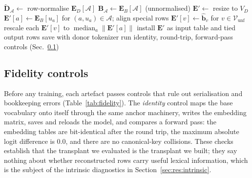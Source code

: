 \begin{algorithm}[!t]
\caption{Tokenizer transplantation ()}
\label{alg:transplant}
$\tilde{\mathbf{D}}_{\mathcal{A}}\leftarrow$ row-normalise $\mathbf{E}_D[\mathcal{A}]$\; $\mathbf{B}_{\mathcal{A}}\leftarrow\mathbf{E}_B[\mathcal{A}]$ (unnormalised)\;
$\mathbf{E}'\leftarrow$ resize to $V_D$\; $\mathbf{E}'[a]\leftarrow\mathbf{E}_B[u_a]$ for $(a,u_a)\in\mathcal{A}$; align special rows\; $\mathbf{E}'[v]\leftarrow\hat{\mathbf{b}}_v$ for $v\in\mathcal{V}_{\mathrm{unf}}$\;
rescale each $\mathbf{E}'[v]$ to $\operatorname{median}_a\|\mathbf{E}'[a]\|$ \tcp*[r]{\eqref{eq:rescale}}
install $\mathbf{E}'$ as input table and tied output rows\; save with donor tokenizer\;
run identity, round-trip, forward-pass controls (Sec.~\ref{sec:method:fidelity})\;
\end{algorithm}

\subsection{Fidelity controls}
\label{sec:method:fidelity}
Before any training, each artefact passes controls that rule out serialisation and bookkeeping errors (Table~\ref{tab:fidelity}). The \emph{identity} control maps the base vocabulary onto itself through the same anchor machinery, writes the embedding matrix, saves and reloads the model, and compares a forward pass: the embedding tables are bit-identical after the round trip, the maximum absolute logit difference is $0.0$, and there are no canonical-key collisions. These checks establish that the transplant we evaluated is the transplant we built; they say nothing about whether reconstructed rows carry useful lexical information, which is the subject of the intrinsic diagnostics in Section~\ref{sec:res:intrinsic}.

